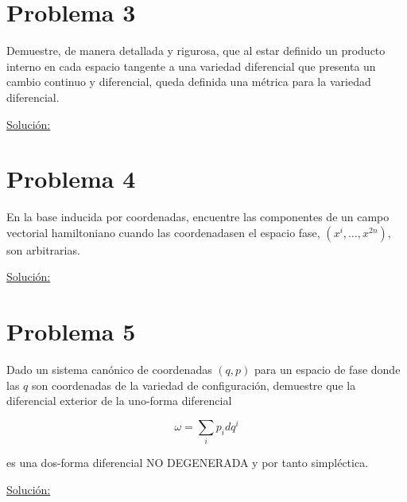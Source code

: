 \documentclass[a4paper,10pt]{article}
\numberwithin{equation}{section}
\begin{document}
\section{Problema 3}

Demuestre, de manera detallada y rigurosa, que al estar definido un producto interno 
en cada espacio tangente a una variedad diferencial que presenta un cambio continuo 
y diferencial, queda definida una métrica para la variedad diferencial.

\vspace{.3cm}

\underline{Solución:} \vspace{.3cm}

\section{Problema 4}

En la base inducida por coordenadas, encuentre las componentes de un campo vectorial 
hamiltoniano cuando las coordenadasen el espacio fase, $(x^i,\dots,x^{2n})$, son 
arbitrarias.

\vspace{.3cm}

\underline{Solución:} \vspace{.3cm}

\section{Problema 5}

Dado un sistema canónico de coordenadas $(q,p)$ para un espacio de fase donde las $q$ 
son coordenadas de la variedad de configuración, demuestre que la diferencial exterior 
de la uno-forma diferencial 

$$
\omega = \sum_i p_idq^i
$$

es una dos-forma diferencial NO DEGENERADA y por tanto simpléctica.

\vspace{.3cm}

\underline{Solución:} \vspace{.3cm}
\end{document}
